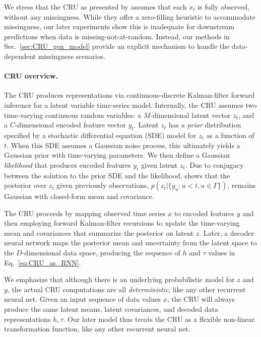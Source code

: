 We stress that the CRU as presented by \citet{schirmer2022modeling} assumes that each $x_t$ is fully observed, without any missingness. While they offer a zero-filling heuristic to accommodate missingness, our later experiments show this is inadequate for downstream predictions when data is missing-not-at-random. Instead, our methods in Sec.~\ref{sec:CRU_gen_model} provide an explicit mechanism to handle the data-dependent missingness scenarios.

\paragraph{CRU overview.}
The CRU produces representations via continuous-discrete Kalman-filter forward inference \citep{jazwinski2007stochastic} for a latent variable time-series model.
Internally, the CRU assumes two time-varying continuous random variables: a $M$-dimensional latent vector $z_t$, and a $C$-dimensional encoded feature vector $y_t$. Latent $z_t$ has a \emph{prior} distribution specified by a stochastic differential equation (SDE) model for $z_t$ as a function of $t$.
When this SDE assumes a Gaussian noise process, this ultimately yields a Gaussian prior with time-varying parameters.
We then define a Gaussian \emph{likelihood} that produces encoded features $y_t$ given latent $z_t$. Due to conjugacy between the solution to the prior SDE and the likelihood, \citet{jazwinski2007stochastic} shows that the posterior over $z_t$ given previously observations, $p( z_t | \{y_u : u < t, u \in \Gamma \})$, remains Gaussian with closed-form mean and covariance.

The CRU proceeds by mapping observed time series $x$ to encoded features $y$ and then employing forward Kalman-filter recursions to update the time-varying mean and covariances that summarize the posterior on latent $z$.
Later, a decoder neural network maps the posterior mean and uncertainty from the latent space to the $D$-dimensional data space, producing the sequence of $h$ and $\tau$ values in Eq.~\eqref{eq:CRU_as_RNN}.

We emphasize that although there is an underlying probabilistic model for $z$ and $y$, the actual CRU computations are all \emph{deterministic}, like any other recurrent neural net. Given an input sequence of data values $x$, the CRU will always produce the same latent means, latent covariances, and decoded data representations $h, \tau$.
Our later model thus treats the CRU as a flexible non-linear transformation function, like any other recurrent neural net.

